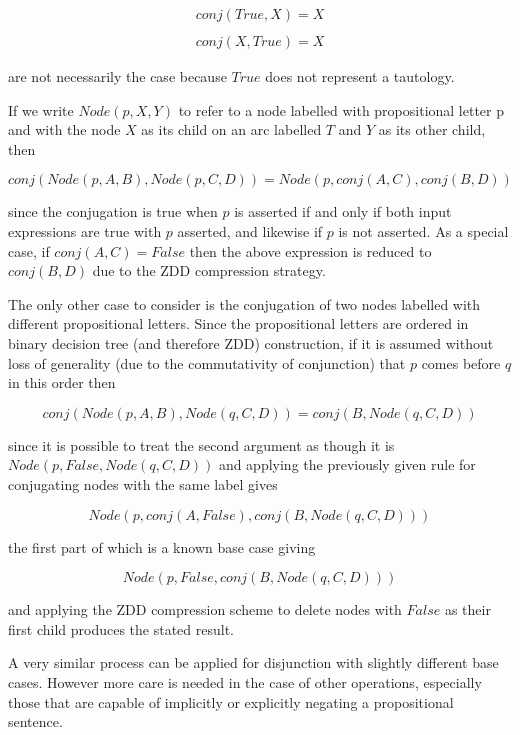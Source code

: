 \documentclass[12pt,a4paper,twoside,openright]{report}
\begin{document}
\begin{gather*}
\mathit{conj}(\mathit{True},X) = X \\ \\
\mathit{conj}(X, \mathit{True}) = X
\end{gather*}

are not necessarily the case because $\mathit{True}$ does not represent a tautology.

If we write $\mathit{Node}(p, X, Y)$ to refer to a node labelled with propositional letter p and with the node $X$ as its child on an arc labelled $T$ and $Y$ as its other child, then

$$
\mathit{conj}(\mathit{Node}(p, A, B), \mathit{Node}(p, C, D)) = \mathit{Node}(p, \mathit{conj}(A,C), \mathit{conj}(B,D))
$$

since the conjugation is true when $p$ is asserted if and only if both input expressions are true with $p$ asserted, and likewise if $p$ is not asserted. As a special case, if $\mathit{conj}(A,C) = \mathit{False}$ then the above expression is reduced to $\mathit{conj}(B,D)$ due to the ZDD compression strategy.

The only other case to consider is the conjugation of two nodes labelled with different propositional letters. Since the propositional letters are ordered in binary decision tree (and therefore ZDD) construction, if it is assumed without loss of generality (due to the commutativity of conjunction) that $p$ comes before $q$ in this order then 

$$
\mathit{conj}(\mathit{Node}(p, A, B), \mathit{Node}(q, C, D)) = \mathit{conj}(B, \mathit{Node}(q, C, D))
$$

since it is possible to treat the second argument as though it is $\mathit{Node}(p, False, \mathit{Node}(q, C, D))$ and applying the previously given rule for conjugating nodes with the same label gives

$$
\mathit{Node}(p, \mathit{conj}(A, False), \mathit{conj}(B, \mathit{Node}(q, C, D)))
$$

the first part of which is a known base case giving

$$
\mathit{Node}(p, False, \mathit{conj}(B, \mathit{Node}(q, C, D)))
$$

and applying the ZDD compression scheme to delete nodes with $\mathit{False}$ as their first child produces the stated result.

A very similar process can be applied for disjunction with slightly different base cases. However more care is needed in the case of other operations, especially those that are capable of implicitly or explicitly negating a propositional sentence.
\end{document}
